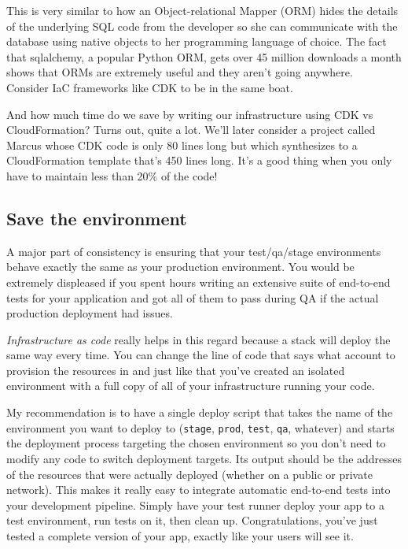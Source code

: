 \documentclass{article}
\newcommand{\noterm}[1]{\textit{#1}}
\newcommand{\term}[1]{\noterm{#1}\index{#1}}
\begin{document}
This is very similar to how an Object-relational Mapper (ORM) hides the details of the underlying SQL code from the developer so she can communicate with the database using native objects to her programming language of choice.
The fact that sqlalchemy, a popular Python ORM, gets over 45 million downloads a month shows that ORMs are extremely useful and they aren't going anywhere.~\cite{sqlalchemy-stats}
Consider IaC frameworks like CDK to be in the same boat.

And how much time do we save by writing our infrastructure using CDK vs CloudFormation?
Turns out, quite a lot.
We'll later consider a project called Marcus whose CDK code is only 80 lines long but which synthesizes to a CloudFormation template that's 450 lines long.
It's a good thing when you only have to maintain less than 20\% of the code!

\subsection{Save the environment}

A major part of consistency is ensuring that your test/qa/stage environments behave exactly the same as your production environment.
You would be extremely displeased if you spent hours writing an extensive suite of end-to-end tests for your application and got all of them to pass during QA if the actual production deployment had issues.

\term{Infrastructure as code} really helps in this regard because a stack will deploy the same way every time.
You can change the line of code that says what account to provision the resources in and just like that you've created an isolated environment with a full copy of all of your infrastructure running your code.

My recommendation is to have a single deploy script that takes the name of the environment you want to deploy to (\texttt{stage}, \texttt{prod}, \texttt{test}, \texttt{qa}, whatever) and starts the deployment process targeting the chosen environment so you don't need to modify any code to switch deployment targets.
Its output should be the addresses of the resources that were actually deployed (whether on a public or private network).
This makes it really easy to integrate automatic end-to-end tests into your development pipeline.
Simply have your test runner deploy your app to a test environment, run tests on it, then clean up.
Congratulations, you've just tested a complete version of your app, exactly like your users will see it.
\end{document}
